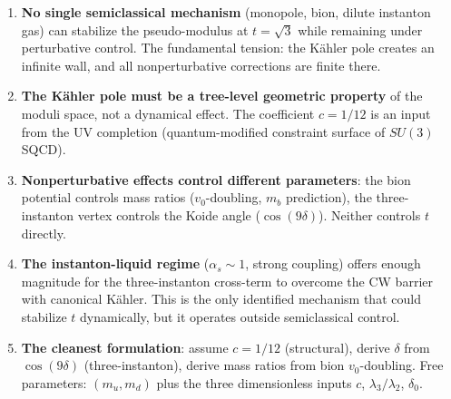 \begin{enumerate}
\item \textbf{No single semiclassical mechanism} (monopole, bion, dilute instanton gas)
can stabilize the pseudo-modulus at $t = \sqrt{3}$ while remaining under perturbative control.
The fundamental tension: the K\"ahler pole creates an infinite wall, and all nonperturbative
corrections are finite there.

\item \textbf{The K\"ahler pole must be a tree-level geometric property} of the moduli space,
not a dynamical effect. The coefficient $c = 1/12$ is an input from the UV completion
(quantum-modified constraint surface of $SU(3)$ SQCD).

\item \textbf{Nonperturbative effects control different parameters}:
the bion potential controls mass ratios ($v_0$-doubling, $m_b$ prediction),
the three-instanton vertex controls the Koide angle ($\cos(9\delta)$).
Neither controls $t$ directly.

\item \textbf{The instanton-liquid regime} ($\alpha_s \sim 1$, strong coupling)
offers enough magnitude for the three-instanton cross-term to overcome the CW barrier
with canonical K\"ahler. This is the only identified mechanism that could stabilize $t$
dynamically, but it operates outside semiclassical control.

\item \textbf{The cleanest formulation}: assume $c = 1/12$ (structural),
derive $\delta$ from $\cos(9\delta)$ (three-instanton),
derive mass ratios from bion $v_0$-doubling.
Free parameters: $(m_u, m_d)$ plus the three dimensionless inputs
$c$, $\lambda_3/\lambda_2$, $\delta_0$.
\end{enumerate}
